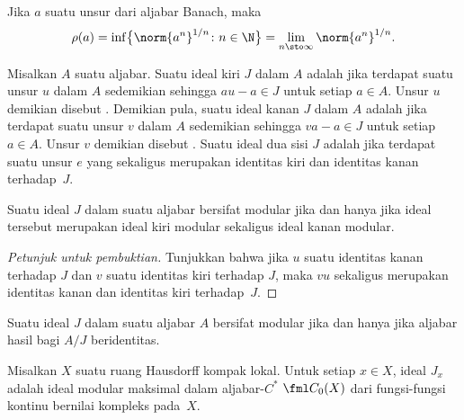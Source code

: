 \begin{thm}\label{00150018} Jika $a$ suatu unsur dari aljabar Banach,
maka
   \[ \rho(a) = \inf\bigl\{\norm{a^n}^{1/n}\colon n \in \N\bigr\}
              = \lim_{n \sto \infty} \norm{a^n}^{1/n}. \]
\end{thm}

\begin{defn} Misalkan $A$ suatu aljabar. Suatu ideal kiri $J$ dalam $A$ adalah
 jika terdapat suatu unsur $u$ dalam $A$ sedemikian sehingga
$au - a \in J$ untuk setiap $a \in A$. Unsur $u$ demikian disebut
. Demikian pula, suatu ideal kanan $J$ dalam $A$ adalah
 jika terdapat suatu unsur $v$ dalam $A$ sedemikian sehingga
$va - a \in J$ untuk setiap $a \in A$. Unsur $v$ demikian disebut
. Suatu ideal dua sisi $J$ adalah
 jika terdapat suatu unsur $e$ yang sekaligus merupakan identitas kiri
dan identitas kanan terhadap~$J$.
\end{defn}

\begin{prop} Suatu ideal $J$ dalam suatu aljabar bersifat modular jika dan hanya jika ideal
tersebut merupakan ideal kiri modular sekaligus ideal kanan modular.
\end{prop}

\begin{proof}[\emph{Petunjuk untuk pembuktian}] Tunjukkan bahwa jika $u$ suatu identitas kanan
terhadap $J$ dan $v$ suatu identitas kiri terhadap $J$, maka $vu$ sekaligus merupakan
identitas kanan dan identitas kiri terhadap~$J$. \ns
\end{proof}

\begin{prop} Suatu ideal $J$ dalam suatu aljabar $A$ bersifat modular jika dan hanya jika
aljabar hasil bagi $A/J$ beridentitas.
\end{prop}

\begin{exam} Misalkan $X$ suatu ruang Hausdorff kompak lokal. Untuk setiap $x \in X$, ideal
$J_x$ adalah ideal modular maksimal dalam aljabar-$C^*$ $\fml C_0(X)$ dari fungsi-fungsi
kontinu bernilai kompleks pada~$X$.
\end{exam}

